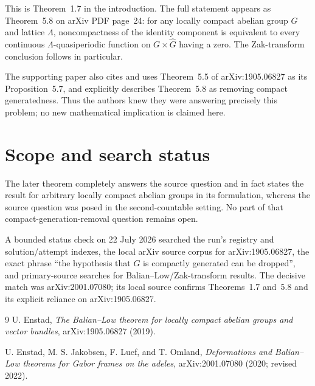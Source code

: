 \documentclass[11pt]{article}
\begin{document}
This is Theorem~1.7 in the introduction.  The full statement appears as
Theorem~5.8 on arXiv PDF page~24: for any locally compact abelian group $G$
and lattice $\Lambda$, noncompactness of the identity component is equivalent
to every continuous $\Lambda$-quasiperiodic function on
$G\times\widehat G$ having a zero.  The Zak-transform conclusion follows in
particular.

The supporting paper also cites and uses Theorem~5.5 of arXiv:1905.06827 as
its Proposition~5.7, and explicitly describes Theorem~5.8 as removing compact
generatedness.  Thus the authors knew they were answering precisely this
problem; no new mathematical implication is claimed here.

\section*{Scope and search status}

The later theorem completely answers the source question and in fact states
the result for arbitrary locally compact abelian groups in its formulation,
whereas the source question was posed in the second-countable setting.  No
part of that compact-generation-removal question remains open.

A bounded status check on 22 July 2026 searched the run's registry and
solution/attempt indexes, the local arXiv source corpus for arXiv:1905.06827,
the exact phrase ``the hypothesis that $G$ is compactly generated can be
dropped'', and primary-source searches for Balian--Low/Zak-transform results.
The decisive match was arXiv:2001.07080; its local source confirms
Theorems~1.7 and~5.8 and its explicit reliance on arXiv:1905.06827.

\begin{thebibliography}{9}
U. Enstad,
\emph{The Balian--Low theorem for locally compact abelian groups and vector
bundles}, arXiv:1905.06827 (2019).

U. Enstad, M. S. Jakobsen, F. Luef, and T. Omland,
\emph{Deformations and Balian--Low theorems for Gabor frames on the adeles},
arXiv:2001.07080 (2020; revised 2022).
\end{thebibliography}
\end{document}
